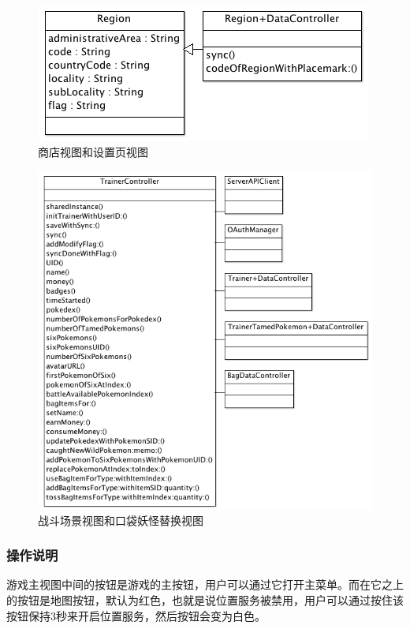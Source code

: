 \documentclass{article}
\begin{document}
\begin{CJK}{UTF8}{gbsn}
  \begin{figure}[htbp]
		\centering
		\includegraphics[bb=0 0 548 341, scale=0.45]{figure/fig_n16.png}
		\caption{商店视图和设置页视图}
		\label{fig:n16}
	\end{figure}

  \begin{figure}[htbp]
		\centering
		\includegraphics[bb=0 0 548 341, scale=0.45]{figure/fig_n17.png}
		\caption{战斗场景视图和口袋妖怪替换视图}
		\label{fig:n17}
	\end{figure}

	\subsubsection{操作说明} 
  游戏主视图中间的按钮是游戏的主按钮，用户可以通过它打开主菜单。而在它之上的按钮是地图按钮，默认为红色，也就是说位置服务被禁用，用户可以通过按住该按钮保持3秒来开启位置服务，然后按钮会变为白色。


\end{CJK}
\end{document}
